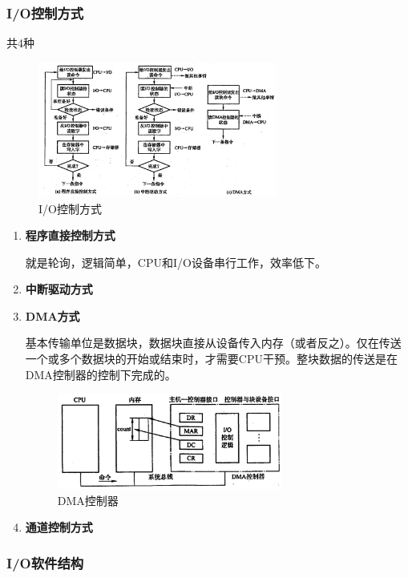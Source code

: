 \documentclass[12pt, a4paper, oneside]{ctexart}
\begin{document}
\begin{enumerate}
  \subsubsection{I/O控制方式}

  共4种
  \begin{figure}
    \centering
    \includegraphics[width=0.7\textwidth]{./images/io-control.png}
    \caption{I/O控制方式}
  \end{figure}
  \begin{enumerate}
    \item {\bf 程序直接控制方式}
    
    就是轮询，逻辑简单，CPU和I/O设备串行工作，效率低下。

    \item {\bf 中断驱动方式}
    \item {\bf DMA方式}
    
    基本传输单位是数据块，数据块直接从设备传入内存（或者反之）。仅在传送一个或多个数据块的开始或结束时，才需要CPU干预。整块数据的传送是在DMA控制器的控制下完成的。
    \begin{figure}
      \centering
      \includegraphics[width=0.7\textwidth]{./images/dma-controller.png}
      \caption{DMA控制器}
    \end{figure}

    \item {\bf 通道控制方式}
  \end{enumerate}
\end{enumerate}

\subsubsection{I/O软件结构}
\end{document}
